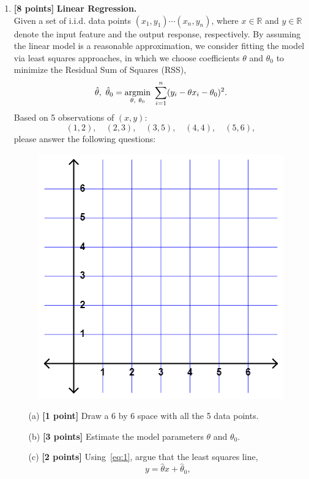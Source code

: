 \documentclass[10pt]{article}
\begin{document}
\begin{enumerate}
	\item \textbf{[8 points]} \textbf{Linear Regression.} \\
	      Given a set of i.i.d. data points $(x_{1},y_{1})\cdots(x_{n},y_{n})$,
	      where $x \in \mathbb{R}$ and $y \in \mathbb{R}$ denote the input feature and the output response, respectively.
	      By assuming the linear model is a reasonable approximation, we consider fitting the model via least squares approaches,
	      in which we choose coefficients $\theta$ and $\theta_0$ to minimize the Residual Sum of Squares (RSS),
	      \begin{equation}
		      \hat{\theta},~ \hat{\theta}_0 = \mathop{\rm argmin}_{\theta,~ \theta_0}~ \sum_{i=1}^{n}(y_{i} -\theta x_{i}-\theta_0)^{2}.
		      \label{eq:1}
	      \end{equation}
	      Based on 5 observations of $(x, y)$:
	      \begin{equation}
		      (1,2), \quad (2,3), \quad (3,5), \quad (4,4), \quad (5,6),
	      \end{equation}
	      please answer the following questions:
	      \begin{figure}
		      \centering
		      \includegraphics[width=.5\linewidth]{cartesian.png}
		      \label{fig:recovery}
	      \end{figure}
	      \begin{itemize}
		      \item[(a)] \textbf{[1 point]} Draw a 6 by 6 space with all the 5 data points.
		      \item[(b)] \textbf{[3 points]} Estimate the model parameters $\theta$ and $\theta_0$.
		      \item[(c)] \textbf{[2 points]} Using~\eqref{eq:1}, argue that the least squares line,
		            \begin{equation}
			            y = \hat{\theta}x + \hat{\theta}_0,

\end{equation}
\end{itemize}
\end{enumerate}
\end{document}
